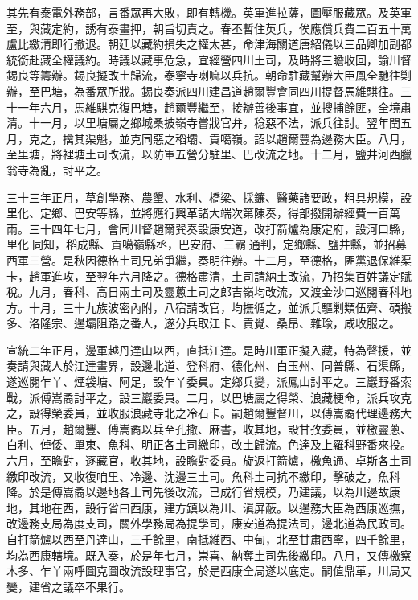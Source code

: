 \begin{pinyinscope}
其先有泰電外務部，言番眾再大敗，即有轉機。英軍進拉薩，圖壓服藏眾。及英軍至，與藏定約，誘有泰畫押，朝旨切責之。春丕暫住英兵，俟應償兵費二百五十萬盧比繳清即行撤退。朝廷以藏約損失之權太甚，命津海關道唐紹儀以三品卿加副都統銜赴藏全權議約。時議以藏事危急，宜經營四川土司，及時將三瞻收回，諭川督錫良等籌辦。錫良擬改土歸流，泰寧寺喇嘛以兵抗。朝命駐藏幫辦大臣鳳全馳往剿辦，至巴塘，為番眾所戕。錫良奏派四川建昌道趙爾豐會同四川提督馬維騏往。三十一年六月，馬維騏克復巴塘，趙爾豐繼至，接辦善後事宜，並搜捕餘匪，全境肅清。十一月，以里塘屬之鄉城桑披嶺寺嘗戕官弁，稔惡不法，派兵往討。翌年閏五月，克之，擒其渠魁，並克同惡之稻壩、貢噶嶺。詔以趙爾豐為邊務大臣。八月，至里塘，將裡塘土司改流，以防軍五營分駐里、巴改流之地。十二月，鹽井河西臘翁寺為亂，討平之。

三十三年正月，草創學務、農墾、水利、橋梁、採鐮、醫藥諸要政，粗具規模，設里化、定鄉、巴安等縣，並將應行興革諸大端次第陳奏，得部撥開辦經費一百萬兩。三十四年七月，會同川督趙爾巽奏設康安道，改打箭爐為康定府，設河口縣，里化同知，稻成縣、貢噶嶺縣丞，巴安府、三霸通判，定鄉縣、鹽井縣，並招募西軍三營。是秋因德格土司兄弟爭繼，奏明往辦。十二月，至德格，匪黨退保維渠卡，趙軍進攻，至翌年六月降之。德格肅清，土司請納土改流，乃招集百姓議定賦稅。九月，春科、高日兩土司及靈蔥土司之郎吉嶺均改流，又渡金沙口巡閱春科地方。十月，三十九族波密內附，八宿請改官，均撫循之，並派兵驅剿類伍齊、碩搬多、洛隆宗、邊壩阻路之番人，遂分兵取江卡、貢覺、桑昂、雜瑜，咸收服之。

宣統二年正月，邊軍越丹達山以西，直抵江達。是時川軍正擬入藏，特為聲援，並奏請與藏人於江達畫界，設邊北道、登科府、德化州、白玉州、同普縣、石渠縣，遂巡閱乍丫、煙袋塘、阿足，設乍丫委員。定鄉兵變，派鳳山討平之。三巖野番索戰，派傅嵩矞討平之，設三巖委員。二月，以巴塘屬之得榮、浪藏梗命，派兵攻克之，設得榮委員，並收服浪藏寺北之冷石卡。嗣趙爾豐督川，以傅嵩矞代理邊務大臣。五月，趙爾豐、傅嵩矞以兵至孔撒、麻書，收其地，設甘孜委員，並檄靈蔥、白利、倬倭、單東、魚科、明正各土司繳印，改土歸流。色達及上羅科野番來投。六月，至瞻對，逐藏官，收其地，設瞻對委員。旋返打箭爐，檄魚通、卓斯各土司繳印改流，又收復咱里、冷邊、沈邊三土司。魚科土司抗不繳印，擊破之，魚科降。於是傅嵩矞以邊地各土司先後改流，已成行省規模，乃建議，以為川邊故康地，其地在西，設行省曰西康，建方鎮以為川、滇屏蔽。以邊務大臣為西康巡撫，改邊務支局為度支司，關外學務局為提學司，康安道為提法司，邊北道為民政司。自打箭爐以西至丹達山，三千餘里，南抵維西、中甸，北至甘肅西寧，四千餘里，均為西康轄境。既入奏，於是年七月，崇喜、納奪土司先後繳印。八月，又傳檄察木多、乍丫兩呼圖克圖改流設理事官，於是西康全局遂以底定。嗣值鼎革，川局又變，建省之議卒不果行。


\end{pinyinscope}
